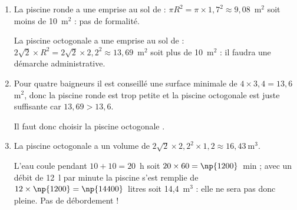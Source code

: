 %
%
 
\begin{enumerate}
\item %
La piscine \og ronde \fg{} a une emprise au sol de : $\pi R^2 = \pi \times 1,7^2 \approx 9,08$~m$^2$ soit moins de 10~m$^2$ : pas de formalité.

La piscine \og octogonale \fg{} a une emprise au sol de : $2\sqrt{2}\times R^2 = 2\sqrt{2} \times 2,2^2 \approx 13,69$~m$^2$ soit plus de 10~m$^2$ : il faudra une démarche administrative. 
\item %
Pour quatre baigneurs il est conseillé une surface minimale de $4 \times 3,4 = 13,6~$m$^2$, donc la piscine \og ronde est trop petite et la piscine \og octogonale \fg{} est juste suffisante car $13,69 > 13,6$.

Il faut donc choisir la piscine \og octogonale \fg.  
\item %
La piscine \og octogonale \fg a un volume de $2\sqrt{2} \times 2,2^2 \times 1,2 \approx 16,43~$m$^3$.

L'eau coule pendant $10 + 10 = 20$~h soit $20 \times 60 = \np{1200}$~min  ; avec un débit de 12~l par minute la piscine s'est remplie de $12 \times \np{1200} = \np{14400}$~litres soit 14,4~m$^3$ : elle ne sera pas donc pleine. Pas de débordement ! 
\end{enumerate} 

\bigskip

